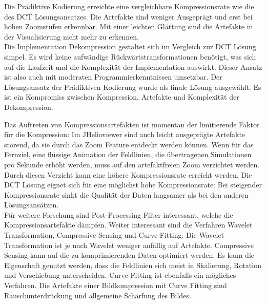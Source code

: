Die Prädiktive Kodierung erreichte eine vergleichbare Kompressionsrate wie die des DCT Lösungsansatzes. Die Artefakte sind weniger Ausgeprägt und erst bei hohen Zoomstufen erkennbar. Mit einer leichten Glättung sind die Artefakte in der Visualisierung nicht mehr zu erkennen.\\
Die Implementation Dekompression gestaltet sich im Vergleich zur DCT Lösung simpel. Es wird keine aufwändige Rückwärtstransformationen benötigt, was sich auf die Laufzeit und die Komplexität der Implementation auswirkt. Dieser Ansatz ist also auch mit moderaten Programmierkenntnissen umsetzbar. Der Lösungsansatz der Prädiktiven Kodierung wurde als finale Lösung ausgewählt. Es ist ein Kompromiss zwischen Kompression, Artefakte und Komplexität der Dekompression.

Das Auftreten von Kompressionsartefakten ist momentan der limitierende Faktor für die Kompression: Im JHelioviewer sind auch leicht ausgeprägte Artefakte störend, da sie durch das Zoom Feature entdeckt werden können. Wenn für das Fernziel, eine flüssige Animation der Feldlinien, die übertragenen Simulationen pro Sekunde erhöht werden, muss auf den artefaktfreien Zoom verzichtet werden. Durch diesen Verzicht kann eine höhere Kompressionsrate erreicht werden. Die DCT Lösung eignet sich für eine möglichst hohe Kompressionsrate: Bei steigender Kompressionsrate sinkt die Qualität der Daten langsamer als bei den anderen Lösungsansätzen.\\
Für weitere Forschung sind Post-Processing Filter interessant, welche die Kompressionsartefakte dämpfen. Weiter interessant sind die Verfahren Wavelet Transformation, Compressive Sensing und Curve Fitting. Die Wavelet Transformation ist je nach Wavelet weniger anfällig auf Artefakte. Compressive Sensing kann auf die zu komprimierenden Daten optimiert werden. Es kann die Eigenschaft genutzt werden, dass die Feldlinien sich meist in Skalierung, Rotation und Verschiebung unterscheiden. Curve Fitting ist ebenfalls ein mögliches Verfahren. Die Artefakte einer Bildkompression mit Curve Fitting sind Rauschunterdrückung und allgemeine Schärfung des Bildes.